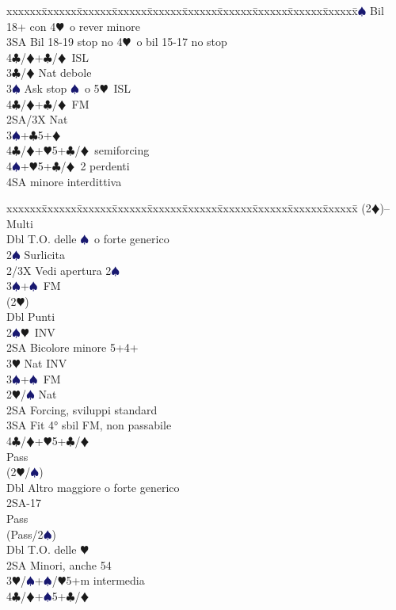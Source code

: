 \documentclass[a4paper,italian]{article}
\newcommand{\BC}{\textcolor{OliveGreen}{$\clubsuit$}}
\newcommand{\BD}{\textcolor{RedOrange}{$\vardiamondsuit$}}
\newcommand{\BH}{\textcolor{Red2}{$\varheartsuit${}}}
\newcommand{\BS}{\textcolor{MidnightBlue}{$\spadesuit${}}}
\newenvironment{bidtable}
{\begin{tabbing}

    xxxxxx\=xxxxxx\=xxxxxx\=xxxxxx\=xxxxxx\=xxxxxx\=xxxxxx\=xxxxxx\=xxxxxx\=xxxxxx\=\kill}
{\end{tabbing} }%
\begin{document}
\begin{multicols}{2}
\begin{bidtable}
        3\BS\> Bil 18+ con 4\BH\ o rever minore\\
        3SA\> Bil 18-19 stop no 4\BH\ o bil 15-17 no stop\\
        4\BC/\BD{}+\BC/\BD\ ISL\-\\
        3\BC/\BD\> Nat debole\\
        3\BS\> Ask stop \BS\ o 5\BH\ ISL\\
        4\BC/\BD{}+\BC/\BD\ FM\-\\
        2SA/3X\>\> Nat\\
        3\BS{}+\BC5+\BD\\
        4\BC/\BD{}+\BH5+\BC/\BD\ semiforcing\\
        4\BS{}+\BH5+\BC/\BD\ 2 perdenti\\
        4SA minore interdittiva
    \end{bidtable}
    \begin{bidtable}
        (2\BD)--\> Multi\\
        Dbl\> T.O. delle \BS\ o forte generico\+\\
        2\BS\> Surlicita\\
        2/3X \> Vedi apertura 2\BS\\
        3\BS{}+\BS\ FM\\
        (2\BH)\+\\
        Dbl\> Punti\\
        2\BS{}\BH\ INV\\
        2SA\> Bicolore minore 5+4+\\
        3\BH\> Nat INV\\
        3\BS{}+\BS\ FM\-\-\\
        2\BH/\BS\> Nat\+\\
        2SA\> Forcing, sviluppi standard\\
        3SA\> Fit 4° sbil FM, non passabile\-\\
        4\BC/\BD{}+\BH5+\BC/\BD\\
        Pass\+\\
        (2\BH/\BS)\+\\
        Dbl\> Altro maggiore o forte generico\\
        2SA-17\\
        Pass\+\\
        (Pass/2\BS)\+\\
        Dbl\> T.O. delle \BH\\
        2SA\> Minori, anche 54\\
        3\BH/\BS{}+\BS/\BH5+m intermedia\\
        4\BC/\BD{}+\BS5+\BC/\BD\\


\end{bidtable}
\end{multicols}
\end{document}
